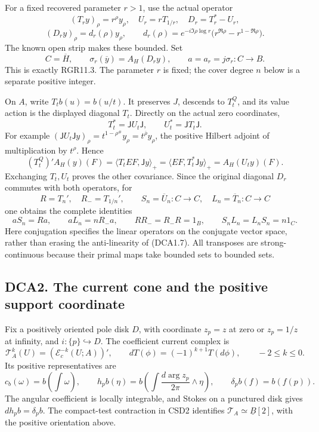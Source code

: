 For a fixed recovered parameter \(r>1\), use the actual operator \[
(T_ry)_\rho=r^\rho y_\rho,\quad U_r=rT_{1/r},\quad
D_r=T_r^*-U_r,
\] \[
(D_ry)_\rho=d_r(\rho)y_\rho,\qquad
d_r(\rho)=e^{-i\Im\rho\log r}
\bigl(r^{\Re\rho}-r^{1-\Re\rho}\bigr).
\tag{DCA1.8}
\] The known open strip makes these bounded. Set \[
C=\overline H,\qquad
\sigma_r(\overline y)=A_H(D_ry),\qquad
a=a_r=j\sigma_r:C\longrightarrow B.
\tag{DCA1.9}
\] This is exactly RGR11.3. The parameter \(r\) is fixed; the cover
degree \(n\) below is a separate positive integer.

On \(A\), write \(T_t b(u)=b(u/t)\). It preserves \(J\), descends to
\(T_t^Q\), and its value action is the displayed diagonal \(T_t\).
Directly on the actual zero coordinates, \[
T_t^*=\mathsf J U_t\mathsf J,\qquad
U_t^*=\mathsf J T_t\mathsf J.
\tag{DCA1.10}
\] For example
\((\mathsf J U_t\mathsf J y)_\rho=t^{1-\rho^\#}y_\rho=t^{\overline\rho}y_\rho\),
the positive Hilbert adjoint of multiplication by \(t^\rho\). Hence \[
(T_t^Q)'A_H(y)(F)
=\langle T_tEF,\mathsf Jy\rangle_+
=\langle EF,T_t^*\mathsf Jy\rangle_+
=A_H(U_ty)(F).
\tag{DCA1.11}
\] Exchanging \(T_t,U_t\) proves the other covariance. Since the
original diagonal \(D_r\) commutes with both operators, for \[
R=T_n',\quad R_-=T_{1/n}',\qquad
S_n=\overline U_n:C\to C,\quad L_n=\overline T_n:C\to C
\tag{DCA1.12}
\] one obtains the complete identities \[
\boxed{aS_n=Ra,\qquad aL_n=nR_-a,\qquad
RR_-=R_-R=1_B,\qquad S_nL_n=L_nS_n=n1_C.}
\tag{DCA1.13}
\] Here conjugation specifies the linear operators on the conjugate
vector space, rather than erasing the anti-linearity of (DCA1.7). All
transposes are strong-continuous because their primal maps take bounded
sets to bounded sets.

\subsection{DCA2. The current cone and the positive support
coordinate}\label{dca2.-the-current-cone-and-the-positive-support-coordinate}

Fix a positively oriented pole disk \(D\), with coordinate \(z_p=z\) at
zero or \(z_p=1/z\) at infinity, and \(i:\{p\}\hookrightarrow D\). The
coefficient current complex is \[
\mathscr T_A^k(U)=(\mathcal E_c^{-k}(U;A))',\qquad
dT(\phi)=(-1)^{k+1}T(d\phi),\qquad -2\leq k\leq0.
\tag{DCA2.1}
\] Its positive representatives are \[
c_b(\omega)=b\left(\int\omega\right),\qquad
h_pb(\eta)=b\left(\int\frac{d\arg z_p}{2\pi}\wedge\eta\right),\qquad
\delta_pb(f)=b(f(p)).
\tag{DCA2.2}
\] The angular coefficient is locally integrable, and Stokes on a
punctured disk gives \(dh_pb=\delta_pb\). The compact-test contraction
in CSD2 identifies \(\mathscr T_A\simeq\underline B[2]\), with the
positive orientation above.

